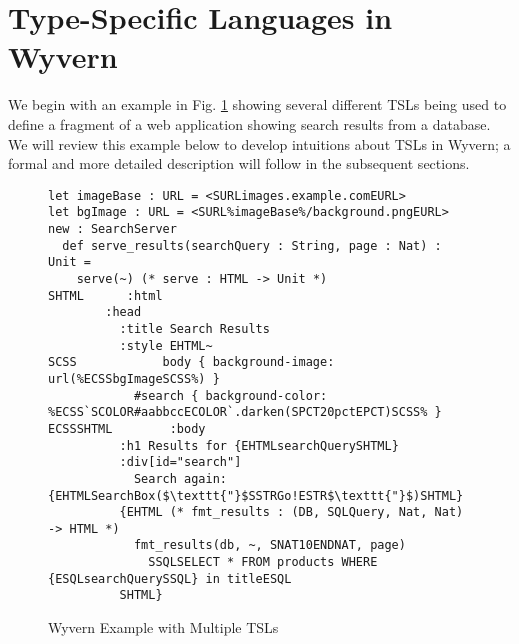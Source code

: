 
\section{Type-Specific Languages in Wyvern}
\label{s:motivation}
We begin with an example in Fig. \ref{f-example} showing several different TSLs being used to define a fragment of a web application showing search results from a database. We will review this example below to develop intuitions about TSLs in Wyvern; a formal and more detailed description will follow in the subsequent sections.
\begin{figure}[t]
\begin{lstlisting}
let imageBase : URL = <SURLimages.example.comEURL>
let bgImage : URL = <SURL%imageBase%/background.pngEURL>
new : SearchServer
  def serve_results(searchQuery : String, page : Nat) : Unit =
    serve(~) (* serve : HTML -> Unit *)
SHTML      :html
        :head
          :title Search Results
          :style EHTML~
SCSS            body { background-image: url(%ECSSbgImageSCSS%) }
            #search { background-color: %ECSS`SCOLOR#aabbccECOLOR`.darken(SPCT20pctEPCT)SCSS% }
ECSSSHTML        :body
          :h1 Results for {EHTMLsearchQuerySHTML}
          :div[id="search"]
            Search again: {EHTMLSearchBox($\texttt{"}$SSTRGo!ESTR$\texttt{"}$)SHTML}
          {EHTML (* fmt_results : (DB, SQLQuery, Nat, Nat) -> HTML *)
            fmt_results(db, ~, SNAT10ENDNAT, page)
              SSQLSELECT * FROM products WHERE {ESQLsearchQuerySSQL} in titleESQL
          SHTML}
\end{lstlisting}
\vspace{-8px}
\caption{Wyvern Example with Multiple TSLs}
\label{f-example}
\vspace{-10px}
\end{figure}

